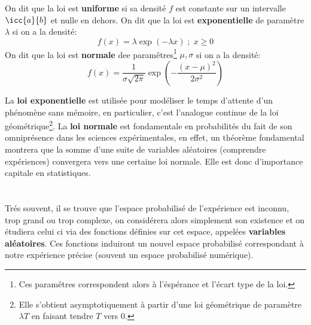 \pagebreak
\subsection*{}

On dit que la loi est \textbf{uniforme} si sa densité \(f\) est constante sur un intervalle \(\icc{a}{b}\) et nulle en dehors.\+
On dit que la loi est \textbf{exponentielle} de paramètre \(\lambda\) si on a la densité:
\[
   f(x) = \lambda\exp{(-\lambda x)} \; ; \; x \geq 0  
\]
On dit que la loi est \textbf{normale} dee paramêtres\footnote[1]{Ces paramêtres correspondent alors à l'éspérance et l'écart type de la loi.} \(\mu, \sigma\) si on a la densité:
\[
   f(x) = \frac{1}{\sigma\sqrt{2\pi}} \exp{\left(-\frac{(x - \mu)^2}{2\sigma^2}\right)}
\]

La \textbf{loi exponentielle} est utilisée pour modéliser le temps d'attente d'un phénomène sans mémoire, en particulier, c'est l'analogue continue de la loi géométrique\footnote[2]{Elle s'obtient asymptotiquement à partir d'une loi géométrique de paramètre \(\lambda T\) en faisant tendre \(T\) vers 0.}. \+
La \textbf{loi normale} est fondamentale en probabilités du fait de son omniprésence dans les sciences expérimentales, en effet, un théorème fondamental montrera que la somme d'une suite de variables aléatoires (comprendre expériences) convergera vers une certaine loi normale. Elle est donc d'importance capitale en statistiques.\+
\chapter*{} %
Trés souvent, il se trouve que l'espace probabilisé de l'expérience est inconnu, trop grand ou trop complexe, on considérera alors simplement son existence et on étudiera celui ci via des fonctions définies sur cet espace, appelées \textbf{variables aléatoires}. Ces fonctions induiront un nouvel espace probabilisé correspondant à notre expérience précise (souvent un espace probabilisé numérique). \<

